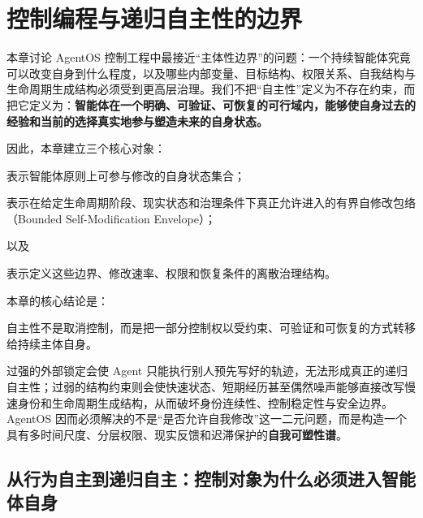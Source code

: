 \chapter{控制编程与递归自主性的边界}
\label{chap:recursive-autonomy-boundary}

\begin{chapterlead}
本章讨论 AgentOS 控制工程中最接近“主体性边界”的问题：一个持续智能体究竟可以改变自身到什么程度，以及哪些内部变量、目标结构、权限关系、自我结构与生命周期生成结构必须受到更高层治理。我们不把“自主性”定义为不存在约束，而把它定义为：\textbf{智能体在一个明确、可验证、可恢复的可行域内，能够使自身过去的经验和当前的选择真实地参与塑造未来的自身状态。}

因此，本章建立三个核心对象：
\begin{statementbox}
\centering
{}
\end{statementbox}
表示智能体原则上可参与修改的自身状态集合；

\begin{statementbox}
\centering
{}
\end{statementbox}
表示在给定生命周期阶段、现实状态和治理条件下真正允许进入的有界自修改包络
（Bounded Self-Modification Envelope）；

以及
\begin{statementbox}
\centering
{}
\end{statementbox}
表示定义这些边界、修改速率、权限和恢复条件的离散治理结构。

本章的核心结论是：
\begin{statementbox}
自主性不是取消控制，而是把一部分控制权以受约束、可验证和可恢复的方式转移给持续主体自身。
\end{statementbox}

过强的外部锁定会使 Agent 只能执行别人预先写好的轨迹，无法形成真正的递归自主性；过弱的结构约束则会使快速状态、短期经历甚至偶然噪声能够直接改写慢速身份和生命周期生成结构，从而破坏身份连续性、控制稳定性与安全边界。AgentOS 因而必须解决的不是“是否允许自我修改”这一二元问题，而是构造一个具有多时间尺度、分层权限、现实反馈和迟滞保护的\textbf{自我可塑性谱}。
\end{chapterlead}


\section{从行为自主到递归自主：控制对象为什么必须进入智能体自身}

